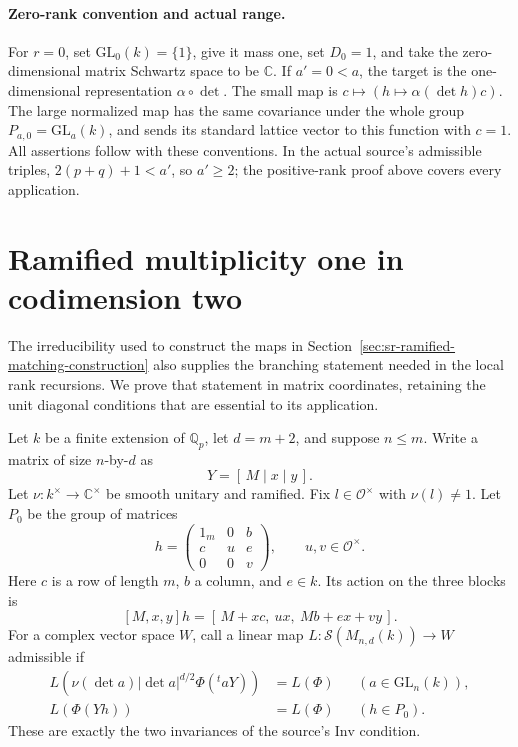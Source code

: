 \paragraph{Zero-rank convention and actual range.}
For \(r=0\), set \(\mathrm{GL}_0(k)=\{1\}\), give it mass
one, set \(D_0=1\), and take the zero-dimensional matrix
Schwartz space to be \(\mathbb C\).
If \(a'=0<a\), the target is the one-dimensional
representation \(\alpha\circ\det\).
The small map is \(c\mapsto(h\mapsto\alpha(\det h)c)\).
The large normalized map has the same covariance under
the whole group \(P_{a,0}=\mathrm{GL}_a(k)\), and sends its
standard lattice vector to this function with \(c=1\).
All assertions follow with these conventions.
In the actual source's admissible triples,
\(2(p+q)+1<a'\), so \(a'\ge2\); the positive-rank proof
above covers every application.


\section{Ramified multiplicity one in codimension two}
\label{sec:sr-ramified-branching}

The irreducibility used to construct the maps in
Section~\ref{sec:sr-ramified-matching-construction} also supplies
the branching statement needed in the local rank recursions.
We prove that statement in matrix coordinates, retaining the
unit diagonal conditions that are essential to its application.

Let \(k\) be a finite extension of \(\mathbb Q_p\),
let \(d=m+2\), and suppose \(n\le m\).
Write a matrix of size \(n\)-by-\(d\) as
\[
                         Y=[\,M\mid x\mid y\,].
\]
Let \(\nu:k^\times\to\mathbb C^\times\) be smooth unitary and
ramified.  Fix \(l\in\mathcal O^\times\) with \(\nu(l)\ne1\).
Let \(P_0\) be the group of matrices
\[
 h=\begin{pmatrix}
       1_m&0&b\\ c&u&e\\0&0&v
    \end{pmatrix},
 \qquad u,v\in\mathcal O^\times .
 \tag{\(*\)}
\]
Here \(c\) is a row of length \(m\), \(b\) a column, and
\(e\in k\).  Its action on the three blocks is
\[
  [M,x,y]h=[\,M+xc,\ ux,\ Mb+ex+vy\,].
\]
For a complex vector space \(W\), call a linear map
\(L:\mathcal S(M_{n,d}(k))\to W\) admissible if
\begin{align}
 L\!\left(\nu(\det a)|\det a|^{d/2}
               \Phi({}^taY)\right)&=L(\Phi)
                       &&(a\in\mathrm{GL}_n(k)),\label{eq:sr-br-left}\\
                         L(\Phi(Yh))&=L(\Phi)
                       &&(h\in P_0).\label{eq:sr-br-right}
\end{align}
These are exactly the two invariances of the source's
\(\mathrm{Inv}\) condition.

